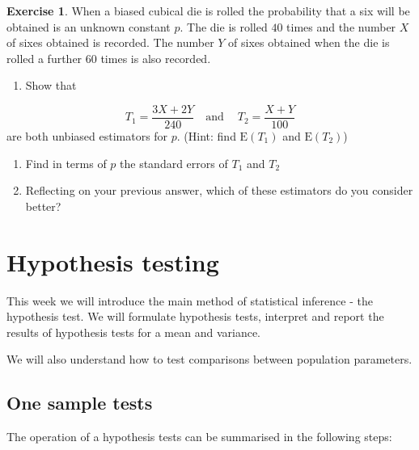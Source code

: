 \documentclass[
]{book}
\providecommand{\tightlist}{%
  \setlength{\itemsep}{0pt}\setlength{\parskip}{0pt}}
\theoremstyle{definition}
\theoremstyle{definition}
\theoremstyle{definition}
\newtheorem{exercise}{Exercise}[chapter]
\theoremstyle{definition}
\theoremstyle{remark}
\begin{document}
\begin{exercise}

When a biased cubical die is rolled the probability that a six will be obtained is an unknown constant \(p\). The die is rolled \(40\) times and the number \(X\) of sixes obtained is recorded. The number \(Y\) of sixes obtained when the die is rolled a further \(60\) times is also recorded.

\begin{enumerate}
\def\labelenumi{\alph{enumi})}
\tightlist
\item
  Show that
\end{enumerate}

\[T_1 = \frac{3X+2Y}{240} \ \ \ \text{    and  } \ \ \ \ T_2 = \frac{X+Y}{100} \]
are both unbiased estimators for \(p\).
(Hint: find \(\text{E}(T_1)\) and \(\text{E}(T_2)\))

\begin{enumerate}
\def\labelenumi{\alph{enumi})}
\setcounter{enumi}{1}
\item
  Find in terms of \(p\) the standard errors of \(T_1\) and \(T_2\)
\item
  Reflecting on your previous answer, which of these estimators do you consider better?
\end{enumerate}

\end{exercise}

\hypertarget{hypothesis-testing}{%
\chapter{Hypothesis testing}\label{hypothesis-testing}}

This week we will introduce the main method of statistical inference - the hypothesis test. We will formulate hypothesis tests, interpret and report the results of hypothesis tests for a mean and variance.

We will also understand how to test comparisons between population parameters.

\hypertarget{one-sample-tests}{%
\section{One sample tests}\label{one-sample-tests}}

The operation of a hypothesis tests can be summarised in the following steps:
\end{document}
